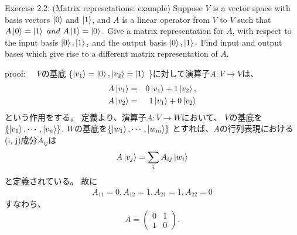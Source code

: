 \begin{flushleft}
{\large Exercise 2.2: (Matrix represetations: example)}
 Suppose $V$ is a vector space with basis vectors $\ket{0}$ and $\ket{1}$,
and $A$ is a linear operator from $V$ to $V$ such that 
$A\ket{0} = \ket{1} ~and~ A\ket{1} = \ket{0}.$ 
Give a matrix representation for $A$, with respect to the input basis 
$\ket{0}, \ket{1},$ and the output basis $\ket{0}, \ket{1}.$ 
Find input and output bases which give rise to a different matrix representation of $A$.

\vspace{0.1in}
{\large proof:}
　$V$の基底
\{$
 \ket{v_1} = \ket{0}, \ket{v_2}=\ket{1} 
$
\}に対して演算子$A:V \to V $は、
\setcounter{equation}{0}
\begin{eqnarray*}
A\ket{v_1} &=& 0\ket{v_1} + 1\ket{v_2},\\
A\ket{v_2} &=& 1\ket{v_1} + 0\ket{v_2}
\end{eqnarray*}
という作用をする。
\newline
定義より、演算子$A:V \to W $において、
$V$の基底を$\{\ket{v_1},\cdots, \ket{v_n}\}$, 
\newline
$W$の基底を$\{\ket{w_1},\cdots, \ket{w_m}\}$
\newline
とすれば、$A$の行列表現における(i, j)成分$A_{ij}$は
\begin{eqnarray}
A\ket{v_j} = \sum_{i} A_{ij} \ket{w_i}
\end{eqnarray}
と定義されている。
 故に
\begin{eqnarray*}
A_{11}=0,
A_{12}=1,
A_{21}=1,
A_{22}=0
\end{eqnarray*}
\newline
すなわち、
\[
A = \left(
	\begin{array}{cc}
	0 & 1\\
	1 & 0
	\end{array}
	\right).
\]

 \end{flushleft}

